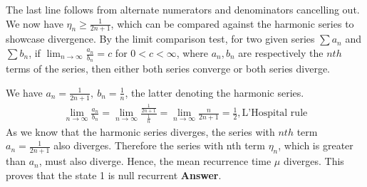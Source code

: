 The last line follows from alternate numerators and denominators cancelling out. We now have $\eta_n \ge \frac{1}{2n+1}$, which can be compared against the harmonic series to showcase divergence. By the limit comparison test, for two given series $\sum a_n$ and $\sum b_n$, if $\lim_{n\to\infty} \frac{a_n}{b_n} = c$ for $0<c<\infty$, where $a_n,b_n$ are respectively the $nth$ terms of the series, then either both series converge or both series diverge.

We have $a_n = \frac{1}{2n+1}, \ b_n = \frac{1}{n}$, the latter denoting the harmonic series.
\begin{gather*}
\lim_{n\to\infty} \frac{a_n}{b_n} = \lim_{n\to\infty} \frac{\frac{1}{2n+1}}{\frac{1}{n}} = \lim_{n\to\infty} \frac{n}{2n+1} = \frac{1}{2}, \text{L'Hospital rule}
\end{gather*}
As we know that the harmonic series diverges, the series with $nth$ term $a_n = \frac{1}{2n+1}$ also diverges. Therefore the series with nth term $\eta_n$, which is greater than $a_n$, must also diverge. Hence, the mean recurrence time $\mu$ diverges. This proves that the state 1 is null recurrent \textbf{Answer}.